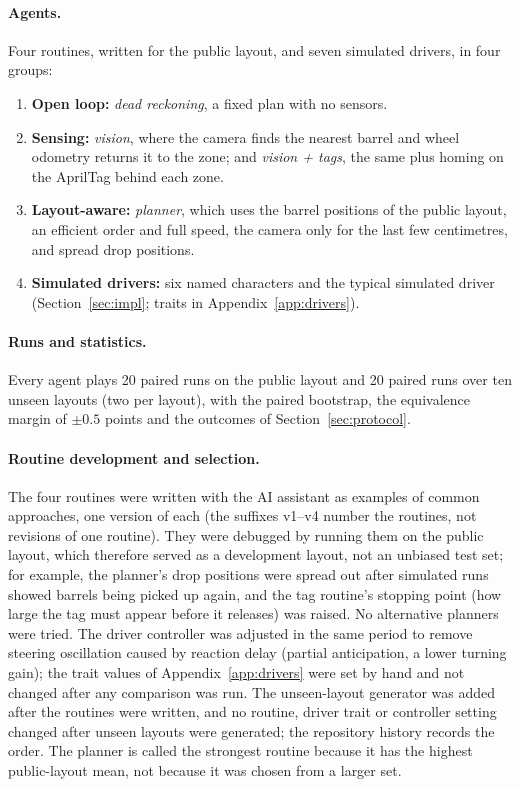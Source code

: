 \documentclass[11pt]{article}
\begin{document}
\paragraph{Agents.} Four routines, written for the public layout, and seven simulated drivers, in
four groups:
\begin{enumerate}[label=(\arabic*)]
  \item \textbf{Open loop:} \emph{dead reckoning}, a fixed plan with no sensors.
  \item \textbf{Sensing:} \emph{vision}, where the camera finds the nearest barrel and wheel odometry
    returns it to the zone; and \emph{vision + tags}, the same plus homing on the AprilTag behind each
    zone.
  \item \textbf{Layout-aware:} \emph{planner}, which uses the barrel positions of the public layout,
    an efficient order and full speed, the camera only for the last few centimetres, and spread drop
    positions.
  \item \textbf{Simulated drivers:} six named characters and the typical simulated driver
    (Section~\ref{sec:impl}; traits in Appendix~\ref{app:drivers}).
\end{enumerate}

\paragraph{Runs and statistics.} Every agent plays 20 paired runs on the public layout and 20 paired runs
over ten unseen layouts (two per layout), with the paired bootstrap, the equivalence margin of
$\pm0.5$ points and the outcomes of Section~\ref{sec:protocol}.

\paragraph{Routine development and selection.} The four routines were written with the AI assistant
as examples of common approaches, one version of each (the suffixes v1--v4 number the routines, not
revisions of one routine). They were debugged by running them on the public layout, which therefore
served as a development layout, not an unbiased test set; for example, the planner's drop positions
were spread out after simulated runs showed barrels being picked up again, and the tag routine's
stopping point (how large the tag must appear before it releases) was raised. No alternative planners were tried. The driver controller was
adjusted in the same period to remove steering oscillation caused by reaction delay (partial
anticipation, a lower turning gain); the trait values of Appendix~\ref{app:drivers} were set by hand
and not changed after any comparison was run. The unseen-layout generator was added after the
routines were written, and no routine, driver trait or controller setting changed after unseen layouts
were generated; the repository history records the order. The planner is called the strongest routine
because it has the highest public-layout mean, not because it was chosen from a larger set.
\end{document}
